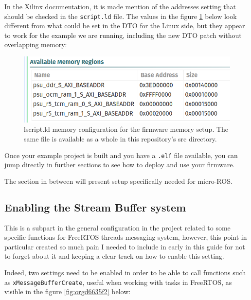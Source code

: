 \documentclass[10pt]{article}
\begin{document}
\pagebreak
In the Xilinx documentation, it is made mention of the addresses setting that should be checked in the \texttt{script.ld} file.
The values in the figure \ref{fig:orgf54f9cc} below look different from what could be set in the DTO for the Linux side, but they appear to
work for the example we are running, including the new DTO patch without overlapping memory:


\begin{figure}[htbp]
\centering
\includegraphics[width=.6\textwidth]{./img/vitis_new/project_mem.png}
\caption{\label{fig:orgf54f9cc}lscript.ld memory configuration for the firmware memory setup. The same file is available as a whole in this repository's src directory.}
\end{figure}


Once your example project is built and you have a \texttt{.elf} file available, you can
jump directly in further sections to see how to deploy and use your firmware.

The section in between will present setup specifically needed for micro-ROS.

\subsection{Enabling the Stream Buffer system}
\label{sec:orgdc1bf70}
This is a subpart in the general configuration in the project related to some specific
functions for FreeRTOS threads messaging system, however, this point in particular
created so much pain I needed to include in early in this guide for not to forget about it
and keeping a clear track on how to enable this setting.

Indeed, two settings need to be enabled in order to be able to call
functions such as \texttt{xMessageBufferCreate}, useful when working with tasks
in FreeRTOS, as visible in the figure \ref{fig:orgd6635f2} below:
\end{document}
